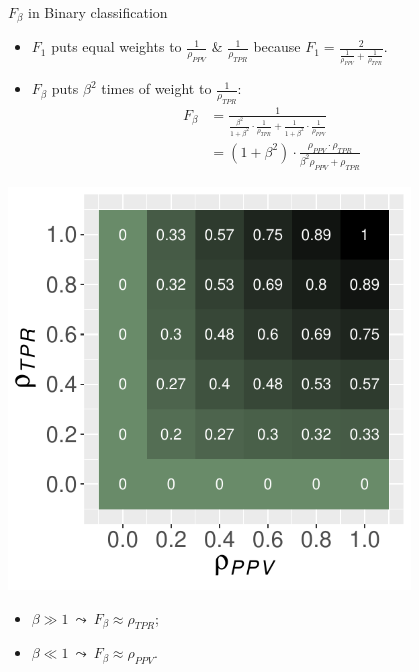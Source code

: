 \documentclass[11pt,compress,t,notes=noshow, xcolor=table]{beamer}
\begin{document}
\begin{vbframe}{$F_\beta$ in Binary classification}
    \footnotesize{
	
    	\begin{minipage}[c]{0.49\textwidth}
            \begin{itemize}
                \item $F_1$ puts equal weights to $\frac{1}{\rho_{PPV}}$ \& $\frac{1}{\rho_{TPR}}$ because $F_1 = \frac{2}{\frac{1}{\rho_{PPV}} + \frac{1}{\rho_{TPR}}}$.
                
                \item $F_\beta$ puts $\beta^2$ times of weight to $\frac{1}{\rho_{TPR}}$:
                    \begin{equation*}
                        \begin{aligned}
                            F_\beta &= \frac{1}{\frac{\beta^2}{1 + \beta^2} \cdot \frac{1}{\rho_{TPR}} + \frac{1}{1 + \beta^2} \cdot \frac{1}{\rho_{PPV}}} \\
                            &= (1 + \beta^2) \cdot \frac{\rho_{PPV} \cdot \rho_{TPR}}{\beta^2 \rho_{PPV} + \rho_{TPR}}
                        \end{aligned}
                    \end{equation*}
            \end{itemize}
    	\end{minipage}
    	\begin{minipage}[c]{0.49\textwidth}
    		\centering
    		\includegraphics[width=0.8\textwidth]{figure/f1_score_plot.pdf}
    	\end{minipage}
    	
    	\begin{itemize}
    		\item $\beta \gg 1 \ \leadsto \ F_\beta \approx \rho_{TPR}$;
            \item $\beta \ll 1 \ \leadsto \ F_\beta \approx \rho_{PPV}$.
      
    	\end{itemize}

    }
    
\end{vbframe}
\end{document}
